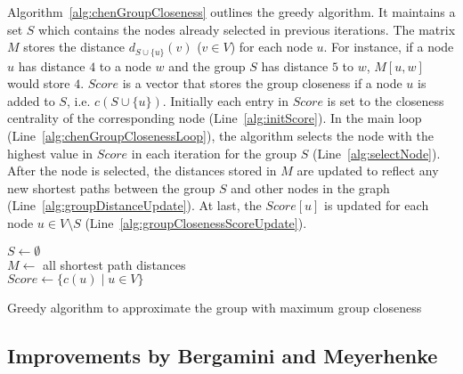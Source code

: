 Algorithm~\ref{alg:chenGroupCloseness} outlines the greedy algorithm. It maintains a set $S$ which contains the nodes already selected in previous iterations. The matrix $M$ stores the distance $d_{S \cup \{u\}}(v)$ ($v \in V$) for each node $u$. For instance, if a node $u$ has distance $4$ to a node $w$ and the group $S$ has distance $5$ to $w$, $M[u, w]$ would store $4$. $Score$ is a vector that stores the group closeness if a node $u$ is added to $S$, i.e. $c(S \cup \{u\})$. Initially each entry in $Score$ is set to the closeness centrality of the corresponding node (Line~\ref{alg:initScore}). In the main loop (Line~\ref{alg:chenGroupClosenessLoop}), the algorithm selects the node with the highest value in $Score$ in each iteration for the group $S$ (Line~\ref{alg:selectNode}). After the node is selected, the distances stored in $M$ are updated to reflect any new shortest paths between the group $S$ and other nodes in the graph (Line~\ref{alg:groupDistanceUpdate}). At last, the $Score[u]$ is updated for each node $u \in V \setminus S$ (Line~\ref{alg:groupClosenessScoreUpdate}).

\begin{algorithm2e}[h!]
  \label{alg:chenGroupCloseness}
 
  $S \gets \emptyset$ \\
  $M \gets $ all shortest path distances \\
  $Score \gets \{c(u) \mid u \in V\}$ \label{alg:initScore} \\
 
  \caption{Greedy algorithm to approximate the group with maximum group closeness}
\end{algorithm2e}

\subsection{Improvements by Bergamini and Meyerhenke}

